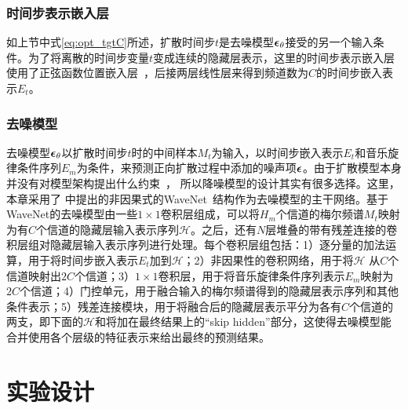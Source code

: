 \subsubsection{时间步表示嵌入层}
如上节中式\eqref{eq:opt_tgtC}所述，扩散时间步$t$是去噪模型${\boldsymbol{\epsilon}}_\theta$接受的另一个输入条件。为了将离散的时间步变量$t$变成连续的隐藏层表示，这里的时间步表示嵌入层使用了正弦函数位置嵌入层~\citep{vaswani2017attention}，后接两层线性层来得到频道数为$C$的时间步嵌入表示$E_t$。
\subsubsection{去噪模型}
去噪模型${\boldsymbol{\epsilon}}_\theta$以扩散时间步$t$时的中间样本$M_t$为输入，以时间步嵌入表示$E_t$和音乐旋律条件序列$E_m$为条件，来预测正向扩散过程中添加的噪声项${\boldsymbol{\epsilon}}$。由于扩散模型本身并没有对模型架构提出什么约束~\citep{sohl2015deep,kong2021diffwave}， 所以降噪模型的设计其实有很多选择。这里，
本章采用了\citet{rethage2018wavenet,kong2021diffwave}
中提出的非因果式的WaveNet~\citep{vanwavenet}结构作为去噪模型的主干网络。基于WaveNet的去噪模型由一些$1\times1$卷积层组成，可以将$H_m$个信道的梅尔频谱$M_t$映射为有$C$个信道的隐藏层输入表示序列$\mathcal{H}$。之后，还有$N$层堆叠的带有残差连接的卷积层组对隐藏层输入表示序列进行处理。每个卷积层组包括：1）逐分量的加法运算，用于将时间步嵌入表示$E_t$加到$\mathcal{H}$；2）非因果性的卷积网络，用于将$\mathcal{H}$ 从$C$个信道映射出$2C$个信道；3）$1\times1$卷积层，用于将音乐旋律条件序列表示$E_m$映射为$2C$个信道；4）门控单元，用于融合输入的梅尔频谱得到的隐藏层表示序列和其他条件表示；5）残差连接模块，用于将融合后的隐藏层表示平分为各有$C$个信道的两支，即下面的$\mathcal{H}$和将加在最终结果上的``skip hidden''部分，这使得去噪模型能合并使用各个层级的特征表示来给出最终的预测结果。
\section{实验设计}
